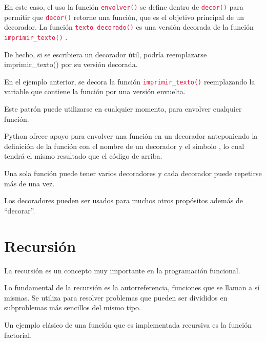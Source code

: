 \documentclass{report}
\newcommand{\doble}[1]{``#1''}
\newcommand{\ttt}[1]{
  \textcolor{Crimson}{\texttt{#1}}
}
\begin{document}

En este caso, el uso la función \ttt{envolver()} se define dentro de \ttt{decor()} para permitir que \ttt{decor()} retorne una función, que es el objetivo principal de un decorador. La función \ttt{texto\_decorado()} es una versión decorada de la función \ttt{imprimir\_texto()}.\smallskip

De hecho, si se escribiera un decorador útil, podría reemplazarse imprimir\_texto() por su versión decorada.


En el ejemplo anterior, se decora la función \ttt{imprimir\_texto()} reemplazando la variable que contiene la función por una versión envuelta.


Este patrón puede utilizarse en cualquier momento, para envolver cualquier función.\smallskip

Python ofrece apoyo para envolver una función en un decorador anteponiendo la definición de la función con el nombre de un decorador y el símbolo \ttt{\@}, lo cual tendrá el mismo resultado que el código de arriba.


Una sola función puede tener varios decoradores y cada decorador puede repetirse más de una vez.


Los decoradores pueden ser usados para muchos otros propósitos además de \doble{decorar}.



\section{Recursión}

La recursión es un concepto muy importante en la programación funcional.\smallskip

Lo fundamental de la recursión es la autorreferencia, funciones que se llaman a sí mismas. Se utiliza para resolver problemas que pueden ser divididos en subproblemas más sencillos del mismo tipo.\smallskip

Un ejemplo clásico de una función que es implementada recursiva es la función factorial.
\end{document}
